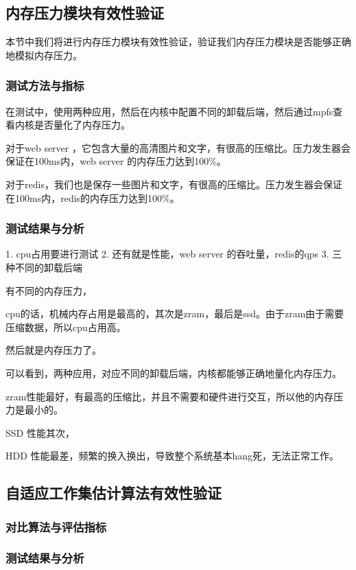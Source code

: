 \subsection{内存压力模块有效性验证}
本节中我们将进行内存压力模块有效性验证，验证我们内存压力模块是否能够正确地模拟内存压力。


\subsubsection{测试方法与指标}

在测试中，使用两种应用，然后在内核中配置不同的卸载后端，然后通过mpfs查看内核是否量化了内存压力。

对于web server ，它包含大量的高清图片和文字，有很高的压缩比。压力发生器会保证在100ms内，web server 的内存压力达到100\%。

对于redis，我们也是保存一些图片和文字，有很高的压缩比。压力发生器会保证在100ms内，redis的内存压力达到100\%。

    \subsubsection{测试结果与分析}


    1. cpu占用要进行测试
    2. 还有就是性能，web server 的吞吐量，redis的qps
    3. 三种不同的卸载后端


    有不同的内存压力，

    cpu的话，机械内存占用是最高的，其次是zram，最后是ssd。由于zram由于需要压缩数据，所以cpu占用高。

    然后就是内存压力了。

    可以看到，两种应用，对应不同的卸载后端，内核都能够正确地量化内存压力。

    zram性能最好，有最高的压缩比，并且不需要和硬件进行交互，所以他的内存压力是最小的。

    SSD 性能其次，

    HDD 性能最差，频繁的换入换出，导致整个系统基本hang死，无法正常工作。


\subsection{自适应工作集估计算法有效性验证}
    \subsubsection{对比算法与评估指标}
    \subsubsection{测试结果与分析}


